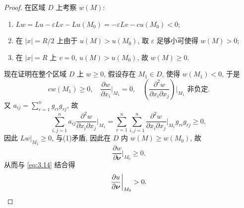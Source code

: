 \begin{proof}
  在区域 $D$ 上考察 $w(M)$:
  \medskip
  \begin{enumerate}[(1)]
    \item $Lw=Lu-\varepsilon Lv-Lu(M_0)=-\varepsilon Lv-cu(M_0)<0$;
    \item 在 $|x| = R/2$ 上由于 $u(M)>u(M_0)$,
      取 $\varepsilon$ 足够小可使得 $w(M)>0$;
    \item 在 $|x| = R$ 上 $v=0$, $u(M)>u(M_0)$, 故 $w(M)\geq 0$.
  \end{enumerate}
  \medskip
  现在证明在整个区域 $D$ 上 $w\geq 0$, 假设存在 $M_1\in D$, 使得 $w(M_1) < 0$, 于是
  \[cw(M_1)\geq 0,\quad \frac{\partial w}{\partial x_i}\bigg|_{M_1} = 0,
    \quad\left(\frac{\partial^2w}{\partial x_i\partial x_j}\right)\bigg|_{M_1}\text{ 非负定}.\]
  又 $a_{ij}=\sum_{r=1}^n g_{ri}g_{rj}$, 故
  \[\sum_{i,j=1}^na_{ij}\frac{\partial^2w}{\partial x_i\partial x_j}
    \bigg|_{M_1}=\sum_{r=1}^n\sum_{i,j=1}^n\frac{\partial^2w}{\partial x_i\partial x_j}
    \bigg|_{M_1}g_{ri}g_{rj}\geq 0,\]
  因此 $Lw|_{M_1}\geq 0$, 与(1)矛盾, 因此在 $D$ 内 $w(M)\geq w(M_0)$, 故
  \[\frac{\partial w}{\partial\bm{\nu}}\bigg|_{M_0} \geq 0.\]
  从而与 \eqref{eq:3.14} 结合得
  \[\frac{\partial u}{\partial\bm{\nu}}\bigg|_{M_0} > 0. \qedhere\]
\end{proof}